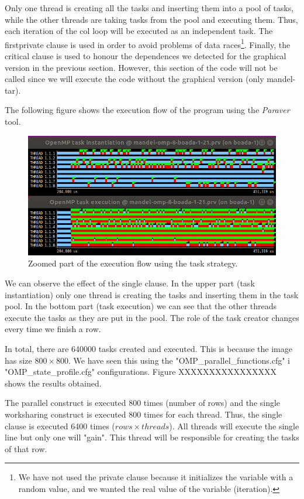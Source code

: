 \documentclass[12pt, a4paper]{article}
\begin{document}
Only one thread is creating all the tasks and inserting them into a pool of tasks, while the other threads are taking tasks from the pool and executing them. Thus, each iteration of the col loop will be executed as an independent task. The firstprivate clause is used in order to avoid problems of data races\footnote{We have not used the private clause because it initializes the variable with a random value, and we wanted the real value of the variable (iteration).}. Finally, the critical clause is used to honour the dependences we detected for the graphical version in the previous section. However, this section of the code will not be called since we will execute the code without the graphical version (only mandel-tar).

The following figure shows the execution flow of the program using the \textit{Paraver} tool.

\begin{figure}[H]
	\centering
	\includegraphics[scale=0.40]{./S2_OMP_tasks}
	\caption{Zoomed part of the execution flow using the task strategy.}
	\label{fig:S2_OMP_tasks}
\end{figure}

We can observe the effect of the single clause. In the upper part (task instantiation) only one thread is creating the tasks and inserting them in the task pool. In the bottom part (task execution) we can see that the other threads execute the tasks as they are put in the pool. The role of the task creator changes every time we finish a row.

In total, there are 640000 tasks created and executed. This is because the image has size $800 \times 800$. We have seen this using the "OMP\_parallel\_functions.cfg" i "OMP\_state\_profile.cfg" configurations. Figure XXXXXXXXXXXXXXXX shows the results obtained.

The parallel construct is executed 800 times (number of rows) and the single worksharing construct is executed 800 times for each thread. Thus, the single clause is executed 6400 times ($rows \times threads$). All threads will execute the single line but only one will "gain". This thread will be responsible for creating the tasks of that row.
\end{document}
